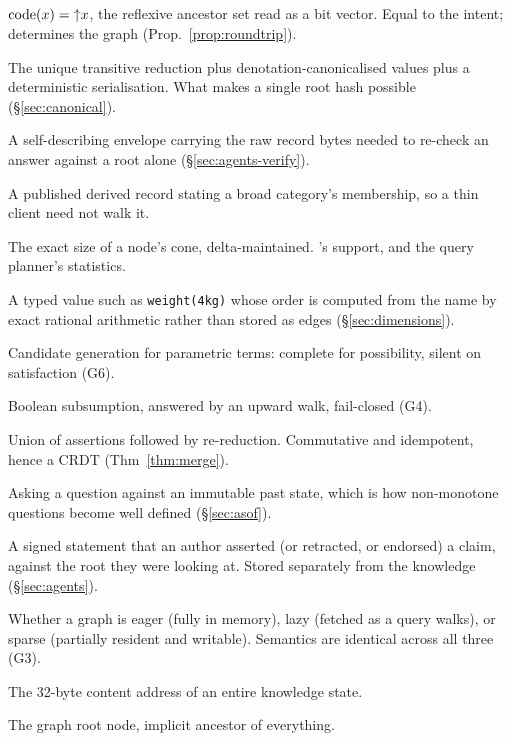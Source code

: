 \subsection*{\odag{}}

\begin{description}[leftmargin=0pt,labelindent=0pt,style=nextline,
                    font=\normalfont\bfseries]
\item[Ancestor-set code] $\mathrm{code}(x) = \mathord{\uparrow}x$, the reflexive ancestor set read
  as a bit vector. Equal to the \fca{} intent; determines the graph
  (Prop.~\ref{prop:roundtrip}).
\item[Canonical form] The unique transitive reduction plus
  denotation-canonicalised values plus a deterministic serialisation. What
  makes a single root hash possible (\S\ref{sec:canonical}).
\item[Certificate] A self-describing envelope carrying the raw record bytes
  needed to re-check an  answer against a root alone
  (\S\ref{sec:agents-verify}).
\item[Cone summary] A published derived record stating a broad category's
  membership, so a thin client need not walk it.
\item[\texttt{descendant\_count}] The exact size of a node's cone,
  delta-maintained. \fca{}'s support, and the query planner's statistics.
\item[Dimension / parametric value] A typed value such as
  \texttt{weight(4kg)} whose order is computed from the name by exact
  rational arithmetic rather than stored as edges (\S\ref{sec:dimensions}).
\item[\texttt{get\_overlapping}] Candidate generation for parametric terms:
  complete for possibility, silent on satisfaction (G6).
\item[\texttt{is\_below}] Boolean subsumption, answered by an upward walk,
  fail-closed (G4).
\item[Merge] Union of assertions followed by re-reduction. Commutative and
  idempotent, hence a CRDT (Thm~\ref{thm:merge}).
\item[Pinned root / as-of] Asking a question against an immutable past state,
  which is how non-monotone questions become well defined (\S\ref{sec:asof}).
\item[Provenance record] A signed statement that an author asserted (or
  retracted, or endorsed) a claim, against the root they were looking at.
  Stored separately from the knowledge (\S\ref{sec:agents}).
\item[Residency] Whether a graph is eager (fully in memory), lazy (fetched as
  a query walks), or sparse (partially resident and writable). Semantics are
  identical across all three (G3).
\item[Root] The 32-byte content address of an entire knowledge state.
\item[\texttt{*}] The graph root node, implicit ancestor of everything.
\end{description}

